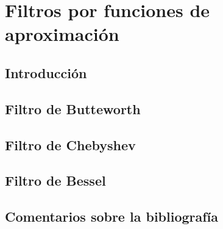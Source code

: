 \documentclass[oneside,a4paper,10pt]{scrbook}
\begin{document}
	\clearpage
   
	\chapter{Filtros por funciones de aproximación}
	{
		\section{Introducción}
   		{
    					
		}
		
		\clearpage
		
    		\section{Filtro de Butteworth}
   		{
    							
		}
		
		\clearpage
		
		\section[]{Filtro de Chebyshev}
   		{
    			
		}
		
		\clearpage
		
		\section{Filtro de Bessel}
   		{
    				
		}
		
		\clearpage
		
		\section{Comentarios sobre la bibliografía}
   		{
    						
		}
	}
	
	\clearpage	
	
\end{document}
